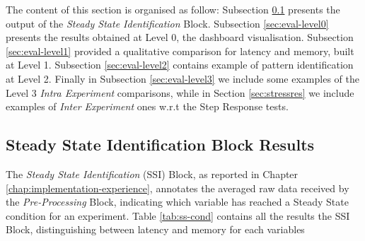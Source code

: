The content of this section is organised as follow: 
Subsection \ref{sec:eval-ssib} presents the output of the \textit{Steady State Identification} Block. 
Subsection \ref{sec:eval-level0} presents the results obtained at Level 0, the dashboard visualisation.  
Subsection \ref{sec:eval-level1} provided a qualitative comparison for latency and memory, built at Level 1. 
Subsection \ref{sec:eval-level2} contains example of pattern identification at Level 2. 
Finally in Subsection \ref{sec:eval-level3} we include some examples of the Level 3 \textit{Intra Experiment }comparisons, while in Section \ref{sec:stressres} we include examples of \textit{Inter Experiment }ones w.r.t the Step Response tests.


\subsection{Steady State Identification Block Results}\label{sec:eval-ssib}

The \textit{Steady State Identification} (SSI) Block, as reported in Chapter \ref{chap:implementation-experience}, annotates the averaged raw data received by the \textit{Pre-Processing} Block, indicating which variable has reached a Steady State condition for an experiment. Table \ref{tab:ss-cond} contains all the results the SSI Block, distinguishing between latency and memory for each variables

